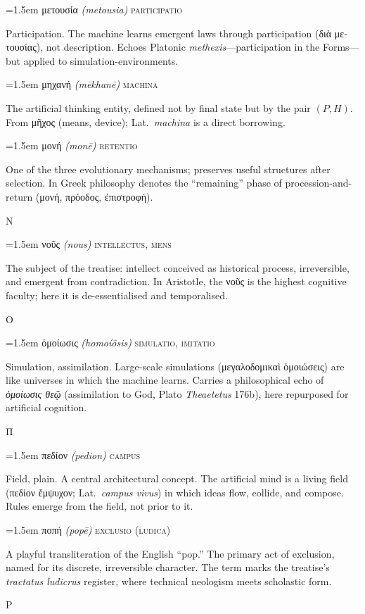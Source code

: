 \documentclass[12pt, oneside, openany]{memoir}
\newcommand{\gk}[1]{\textgreek{#1}}
\newcommand{\gkblue}[1]{{\color{greekblue}\textgreek{#1}}}
\newcommand{\gentry}[4]{%
  \noindent\hangindent=1.5em
  {\gkblue{#1}}\enspace
  {\itshape(#2)}\enspace
  {\color{rubricate}\textperiodcentered}\enspace
  {\scshape #3}\par
  \hspace*{1.5em}%
  \parbox[t]{\dimexpr\linewidth-1.5em\relax}{\strut#4\strut}%
  \par\addvspace{6pt}}
\begin{document}
\gentry{μετουσία}{metousia}{participatio}
{Participation. The machine learns emergent laws through participation (\gk{διὰ μετουσίας}), not description. Echoes Platonic \textit{methexis}---participation in the Forms---but applied to simulation-environments.}

\gentry{μηχανή}{m\={e}khan\={e}}{machina}
{The artificial thinking entity, defined not by final state but by the pair $(P, H)$. From \gk{μῆχος} (means, device); Lat.\ \textit{machina} is a direct borrowing.}

\gentry{μονή}{mon\={e}}{retentio}
{One of the three evolutionary mechanisms; preserves useful structures after selection. In Greek philosophy denotes the ``remaining'' phase of procession-and-return (\gk{μονή}, \gk{πρόοδος}, \gk{ἐπιστροφή}).}

\bigskip
{\centering\color{rubricate}\large\scshape Ν \par}\medskip

\gentry{νοῦς}{nous}{intellectus, mens}
{The subject of the treatise: intellect conceived as historical process, irreversible, and emergent from contradiction. In Aristotle, the \gk{νοῦς} is the highest cognitive faculty; here it is de-essentialised and temporalised.}

\bigskip
{\centering\color{rubricate}\large\scshape Ο \par}\medskip

\gentry{ὁμοίωσις}{homoí\={o}sis}{simulatio, imitatio}
{Simulation, assimilation. Large-scale simulations (\gk{μεγαλοδομικαὶ ὁμοιώσεις}) are like universes in which the machine learns. Carries a philosophical echo of \textit{ὁμοίωσις θεῷ} (assimilation to God, Plato \textit{Theaetetus} 176b), here repurposed for artificial cognition.}

\bigskip
{\centering\color{rubricate}\large\scshape Π \par}\medskip

\gentry{πεδίον}{pedion}{campus}
{Field, plain. A central architectural concept. The artificial mind is a living field (\gk{πεδίον ἔμψυχον}; Lat.\ \textit{campus vivus}) in which ideas flow, collide, and compose. Rules emerge from the field, not prior to it.}

\gentry{ποπή}{pop\={e}}{exclusio (ludica)}
{A playful transliteration of the English ``pop.'' The primary act of exclusion, named for its discrete, irreversible character. The term marks the treatise's \textit{tractatus ludicrus} register, where technical neologism meets scholastic form.}

\bigskip
{\centering\color{rubricate}\large\scshape Ρ \par}\medskip
\end{document}

